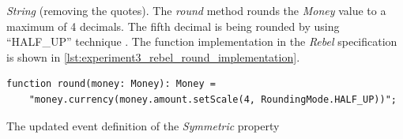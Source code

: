 \textit{String} (removing the quotes). The \textit{round} method rounds the
\textit{Money} value to a maximum of 4 decimals. The fifth decimal is being
rounded by using ``HALF\_UP'' technique
. The function implementation
in the \textit{Rebel} specification is shown in
\autoref{lst:experiment3_rebel_round_implementation}.
\FloatBarrier
\begin{sourcecode}[!ht]
\begin{lstlisting}[language=Rebel]
function round(money: Money): Money =
    "money.currency(money.amount.setScale(4, RoundingMode.HALF_UP))";
\end{lstlisting}
\caption{The updated event definition of the \textit{Symmetric} property}
\label{lst:experiment3_rebel_round_implementation}
\end{sourcecode}
\FloatBarrier

